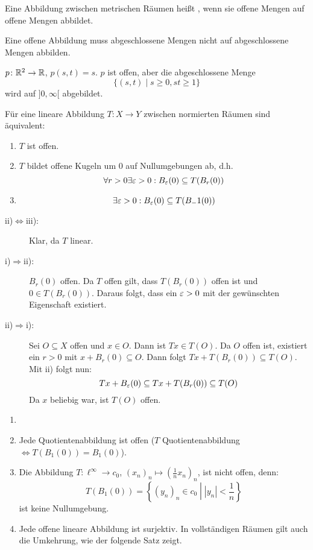 \begin{definition}
	Eine Abbildung zwischen metrischen R\"aumen hei\ss t , wenn sie offene Mengen  auf offene Mengen abbildet.
\end{definition}
\begin{bemerkung*}
	Eine offene Abbildung muss abgeschlossene Mengen nicht auf abgeschlossene Mengen abbilden.
	\begin{beispiel*}
		$ p\colon\mathbb{R}^2\rightarrow\mathbb{R} $, $ p(s,t)=s $. $ p $ ist offen, aber die abgeschlossene Menge \[ \lbrace (s,t)\mid s\geq 0,st\geq 1\rbrace \] wird auf $ ]0,\infty[ $ abgebildet.
	\end{beispiel*}
\end{bemerkung*}
\newpage
\begin{lemma}
	F\"ur eine lineare Abbildung $ T\colon X\rightarrow Y $ zwischen normierten R\"aumen sind \"aquivalent:
	\begin{enumerate}
		\item $ T $ ist offen.
		\item $ T $ bildet offene Kugeln um $ 0 $ auf Nullumgebungen ab, d.h.
		\[ \forall r>0\exists\varepsilon>0: B_\varepsilon(0)\subseteq T(B_r(0)) \]
		\item \[ \exists\varepsilon>0: B_\varepsilon(0)\subseteq T(B_-1(0)) \]
	\end{enumerate}
\end{lemma}
\begin{beweis}
	\begin{description}
		\item[ii)$ \Leftrightarrow $iii):] Klar, da $ T $ linear.
		\item[i)$ \Rightarrow $ii):] $ B_r(0) $ offen. Da $ T $ offen gilt, dass $ T(B_r(0)) $ offen ist und $ 0\in T(B_r(0)) $. Daraus folgt, dass ein $ \varepsilon>0 $ mit der gew\"unschten Eigenschaft existiert.
		\item[ii)$ \Rightarrow $i):] Sei $ O\subseteq X $ offen und $ x\in O $. Dann ist $ Tx\in T(O) $. Da $ O $ offen ist, existiert ein $ r>0 $ mit $ x+B_r(0)\subseteq O $. Dann folgt $ Tx+T(B_r(0))\subseteq T(O) $. Mit ii) folgt nun:
		\[ Tx+B_\varepsilon(0)\subseteq Tx+T(B_r(0))\subseteq T(O) \]
		Da $ x $ beliebig war, ist $ T(O) $ offen.
	\end{description}
\end{beweis}
\begin{beispiel*}
	\begin{enumerate}
		\item[]
		\item Jede Quotientenabbildung ist offen ($ T $ Quotientenabbildung$ \Leftrightarrow T(B_1(0))=B_1(0) $).
		\item Die Abbildung $ T\colon\ell^\infty\rightarrow c_0 $, $ (x_n)_n\mapsto\left(\frac{1}{n}x_n\right)_n $, ist nicht offen, denn:
		\[ T(B_1(0))=\left\lbrace (y_n)_n\in c_0\middle| |y_n|<\frac{1}{n}\right\rbrace \]
		ist keine Nullumgebung.
		\item Jede offene lineare Abbildung ist surjektiv. In vollst\"andigen R\"aumen gilt auch die Umkehrung, wie der folgende Satz zeigt.
	\end{enumerate}
\end{beispiel*}
